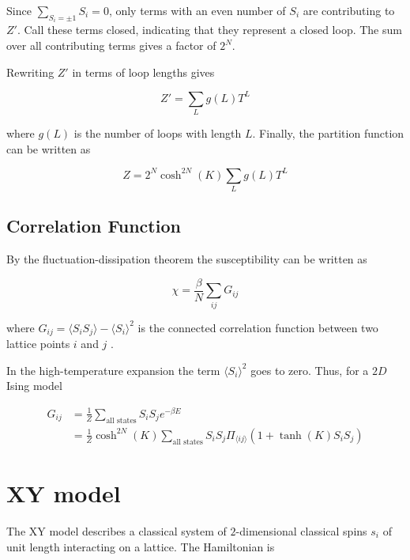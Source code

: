 Since $\sum_{S_i = \pm 1} S_i = 0$, only terms with an even number of $S_i$ are contributing to $Z'$. Call these terms closed, indicating that they represent a closed loop. The sum over all contributing terms gives a factor of $2^N$.

Rewriting $Z'$ in terms of loop lengths gives

\begin{equation}
    Z' = \sum_L g(L) T^L
\end{equation}

\noindent where $g(L)$ is the number of loops with length $L$. Finally, the partition function can be written as

\begin{equation}
    Z = 2^N \cosh^{2N} (K) \sum_L g(L) T^L
\end{equation}

\subsection{Correlation Function}
\label{subsec:CorrelationFunction}

By the fluctuation-dissipation theorem the susceptibility can be written as 

\begin{equation}
    \chi = \frac{\beta}{N} \sum_{ij} G_{ij}
\end{equation}

\noindent where $G_{ij} = \langle S_i S_j \rangle - \langle S_i \rangle^2$ is the connected correlation function between two lattice points $i$ and $j$ \cite{Chaikin:PrincCondencedMatterPhysics}.

In the high-temperature expansion the term $\langle S_i \rangle^2$ goes to zero. Thus, for a $2D$ Ising model

\begin{align}
    G_{ij} &= \frac{1}{Z} \sum_{\text{all states}} S_i S_j e^{-\beta E} \\
    &= \frac{1}{Z} \cosh^{2N} (K) \sum_{\text{all states}} S_i S_j \Pi_{\langle ij \rangle} (1 + \tanh(K) S_i S_j)
\end{align}

\section{XY model}
\label{sec:XYModel}

The XY model describes a classical system of $2$-dimensional classical spins $s_i$ of unit length interacting on a lattice. The Hamiltonian is


